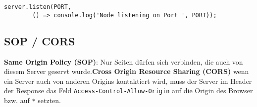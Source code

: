 \documentclass[11pt,twoside,landscape]{article}
\begin{document}
\begin{multicols*}{2}
\begin{verbatim}
server.listen(PORT,
        () => console.log('Node listening on Port ', PORT));
\end{verbatim}

\subsection{SOP / CORS}
\textbf{Same Origin Policy (SOP)}: Nur Seiten dürfen sich verbinden, die auch von diesem Server geservt wurde.\textbf{Cross Origin Resource Sharing (CORS)} wenn ein Server auch von anderen Origins kontaktiert wird, muss der Server im Header der Response das Feld \verb+Access-Control-Allow-Origin+ auf die Origin des Browser bzw. auf \verb+*+ setzten.

\end{multicols*}
\end{document}
